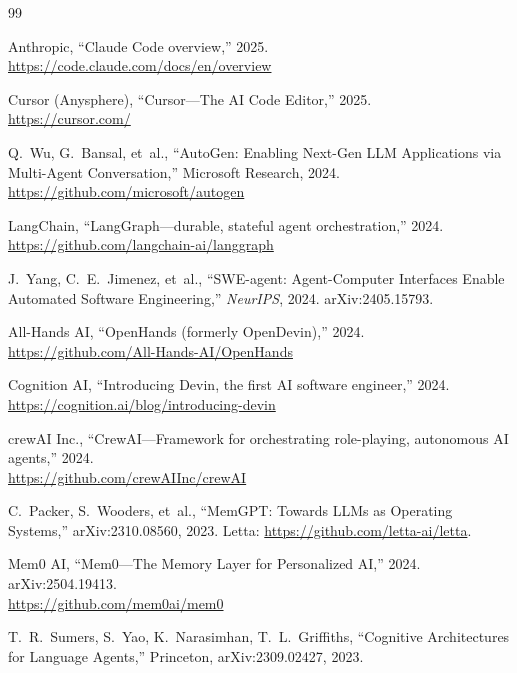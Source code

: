 \documentclass[12pt]{article}
\begin{document}
\begin{thebibliography}{99}


Anthropic, ``Claude Code overview,'' 2025. \\
\url{https://code.claude.com/docs/en/overview}

Cursor (Anysphere), ``Cursor---The AI Code Editor,'' 2025. \\
\url{https://cursor.com/}

Q.~Wu, G.~Bansal, et~al., ``AutoGen: Enabling Next-Gen LLM Applications via Multi-Agent Conversation,'' Microsoft Research, 2024. \\
\url{https://github.com/microsoft/autogen}

LangChain, ``LangGraph---durable, stateful agent orchestration,'' 2024. \\
\url{https://github.com/langchain-ai/langgraph}

J.~Yang, C.~E.~Jimenez, et~al., ``SWE-agent: Agent-Computer Interfaces Enable Automated Software Engineering,'' \emph{NeurIPS}, 2024. arXiv:2405.15793.

All-Hands AI, ``OpenHands (formerly OpenDevin),'' 2024. \\
\url{https://github.com/All-Hands-AI/OpenHands}

Cognition AI, ``Introducing Devin, the first AI software engineer,'' 2024. \\
\url{https://cognition.ai/blog/introducing-devin}

crewAI Inc., ``CrewAI---Framework for orchestrating role-playing, autonomous AI agents,'' 2024. \\
\url{https://github.com/crewAIInc/crewAI}


C.~Packer, S.~Wooders, et~al., ``MemGPT: Towards LLMs as Operating Systems,'' arXiv:2310.08560, 2023. Letta: \url{https://github.com/letta-ai/letta}.

Mem0 AI, ``Mem0---The Memory Layer for Personalized AI,'' 2024. arXiv:2504.19413. \\
\url{https://github.com/mem0ai/mem0}

T.~R.~Sumers, S.~Yao, K.~Narasimhan, T.~L.~Griffiths, ``Cognitive Architectures for Language Agents,'' Princeton, arXiv:2309.02427, 2023.


\end{thebibliography}
\end{document}

